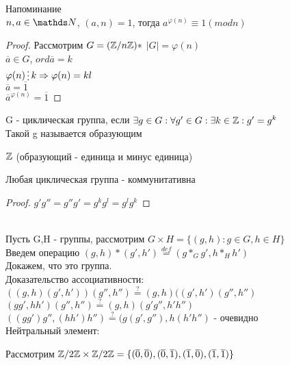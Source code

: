 \documentclass[12pt, fleqn]{article}
\begin{document}
\begin{consequence}
	Напоминание\\
    $n,a \in \N$, $(a,n)=1$, тогда $a^{\varphi(n)} \equiv 1 (mod n)$
\end{consequence}

\begin{proof}
    Рассмотрим $G=(\mathbb{Z} / n \mathbb{Z})*$ $|G|=\varphi(n)$\\
    $\overline{a} \in G$, $ord \overline{a}=k$\\
    $\varphi(n) \devides k \Ra \varphi(n) = kl$\\
    $\overline{a}=\overline{1}$\\
    $\overline{a}^{\varphi(n)}=\overline{1}$
\end{proof}

\begin{definition}
    G - циклическая группа, если $\exists g \in G: \forall g' \in G: \exists k \in \mathbb{Z}: g'=g^k$\\
    Такой g называется образующим
\end{definition}

\begin{definition}
    $\mathbb{Z}$ (образующий - единица и минус единица)
\end{definition}

\begin{remark}
    Любая циклическая группа - коммунитативна
\end{remark}

\begin{proof}
    $g' g'' = g'' g' = g^k g^l = g^l g^k$
\end{proof}
\\
Пусть G,H - группы, рассмотрим $G \times H = \{(g,h): g\in G, h\in H\}$\\
Введем операцию $(g,h)*(g',h')\overset{def}{=}(g*_G g', h*_H h')$\\
Докажем, что это группа.\\
Доказательство ассоциативности:
$((g,h)(g',h'))(g'',h'') \overset{?}{=} (g,h)((g',h')(g'',h'')$\\
$(gg',hh')(g'',h'') \overset{?}{=} (g,h)(g' g'', h' h'')$\\
$((gg')g'',(hh')h'') \overset{?}{=} (g(g',g''),h(h'h'')$ - очевидно\\
Нейтральный элемент:

Рассмотрим $\mathbb{Z} /2 \mathbb{Z} \times \mathbb{Z} /2 \mathbb{Z} = \{(\overline{0},\overline{0}),(\overline{0},\overline{1}),(\overline{1},\overline{0}),(\overline{1},\overline{1})\}$
\end{document}
